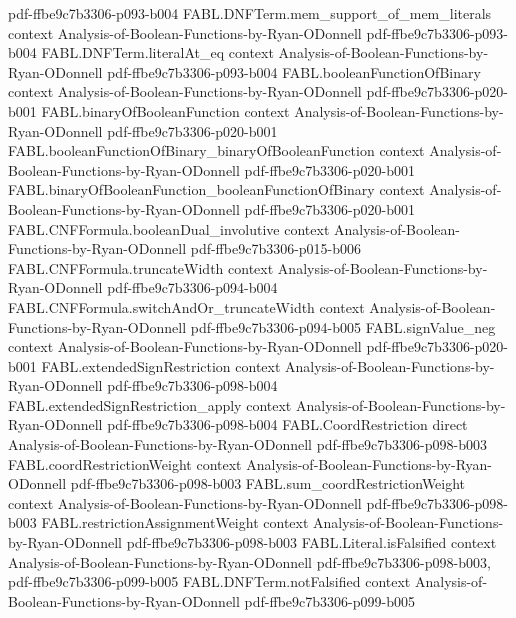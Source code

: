 \begin{theorem}
  {pdf-ffbe9c7b3306-p093-b004}
\proofstep
  {FABL.DNFTerm.mem_support_of_mem_literals}
  {context}
  {Analysis-of-Boolean-Functions-by-Ryan-ODonnell}
  {pdf-ffbe9c7b3306-p093-b004}
\proofstep
  {FABL.DNFTerm.literalAt_eq}
  {context}
  {Analysis-of-Boolean-Functions-by-Ryan-ODonnell}
  {pdf-ffbe9c7b3306-p093-b004}
\proofstep
  {FABL.booleanFunctionOfBinary}
  {context}
  {Analysis-of-Boolean-Functions-by-Ryan-ODonnell}
  {pdf-ffbe9c7b3306-p020-b001}
\proofstep
  {FABL.binaryOfBooleanFunction}
  {context}
  {Analysis-of-Boolean-Functions-by-Ryan-ODonnell}
  {pdf-ffbe9c7b3306-p020-b001}
\proofstep
  {FABL.booleanFunctionOfBinary_binaryOfBooleanFunction}
  {context}
  {Analysis-of-Boolean-Functions-by-Ryan-ODonnell}
  {pdf-ffbe9c7b3306-p020-b001}
\proofstep
  {FABL.binaryOfBooleanFunction_booleanFunctionOfBinary}
  {context}
  {Analysis-of-Boolean-Functions-by-Ryan-ODonnell}
  {pdf-ffbe9c7b3306-p020-b001}
\proofstep
  {FABL.CNFFormula.booleanDual_involutive}
  {context}
  {Analysis-of-Boolean-Functions-by-Ryan-ODonnell}
  {pdf-ffbe9c7b3306-p015-b006}
\proofstep
  {FABL.CNFFormula.truncateWidth}
  {context}
  {Analysis-of-Boolean-Functions-by-Ryan-ODonnell}
  {pdf-ffbe9c7b3306-p094-b004}
\proofstep
  {FABL.CNFFormula.switchAndOr_truncateWidth}
  {context}
  {Analysis-of-Boolean-Functions-by-Ryan-ODonnell}
  {pdf-ffbe9c7b3306-p094-b005}
\proofstep
  {FABL.signValue_neg}
  {context}
  {Analysis-of-Boolean-Functions-by-Ryan-ODonnell}
  {pdf-ffbe9c7b3306-p020-b001}
\proofstep
  {FABL.extendedSignRestriction}
  {context}
  {Analysis-of-Boolean-Functions-by-Ryan-ODonnell}
  {pdf-ffbe9c7b3306-p098-b004}
\proofstep
  {FABL.extendedSignRestriction_apply}
  {context}
  {Analysis-of-Boolean-Functions-by-Ryan-ODonnell}
  {pdf-ffbe9c7b3306-p098-b004}
\proofstep
  {FABL.CoordRestriction}
  {direct}
  {Analysis-of-Boolean-Functions-by-Ryan-ODonnell}
  {pdf-ffbe9c7b3306-p098-b003}
\proofstep
  {FABL.coordRestrictionWeight}
  {context}
  {Analysis-of-Boolean-Functions-by-Ryan-ODonnell}
  {pdf-ffbe9c7b3306-p098-b003}
\proofstep
  {FABL.sum_coordRestrictionWeight}
  {context}
  {Analysis-of-Boolean-Functions-by-Ryan-ODonnell}
  {pdf-ffbe9c7b3306-p098-b003}
\proofstep
  {FABL.restrictionAssignmentWeight}
  {context}
  {Analysis-of-Boolean-Functions-by-Ryan-ODonnell}
  {pdf-ffbe9c7b3306-p098-b003}
\proofstep
  {FABL.Literal.isFalsified}
  {context}
  {Analysis-of-Boolean-Functions-by-Ryan-ODonnell}
  {pdf-ffbe9c7b3306-p098-b003,
    pdf-ffbe9c7b3306-p099-b005}
\proofstep
  {FABL.DNFTerm.notFalsified}
  {context}
  {Analysis-of-Boolean-Functions-by-Ryan-ODonnell}
  {pdf-ffbe9c7b3306-p099-b005}

\end{theorem}
